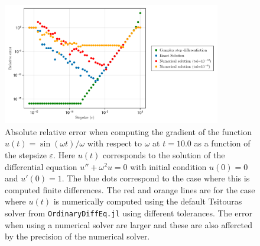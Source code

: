 \begin{figure}[tbh]
    \centering
    \includegraphics[width=0.85\textwidth]{../code/finite_differences/finite_difference_derivative.pdf}
    \caption{Absolute relative error when computing the gradient of the function $u(t) = \sin (\omega t)/\omega$ with respect to $\omega$ at $t=10.0$ as a function of the stepsize $\varepsilon$. Here $u(t)$ corresponds to the solution of the differential equation $u'' + \omega^2 u = 0$ with initial condition $u(0)=0$ and $u'(0)=1$. The blue dots correspond to the case where this is computed finite differences. The red and orange lines are for the case where $u(t)$ is numerically computed using the default Tsitouras solver \cite{Tsitouras_2011} from \texttt{OrdinaryDiffEq.jl} using different tolerances. The error when using  a numerical solver are larger and these are also affercted by the precision of the numerical solver. }
    \label{fig:finite-diff}
\end{figure}